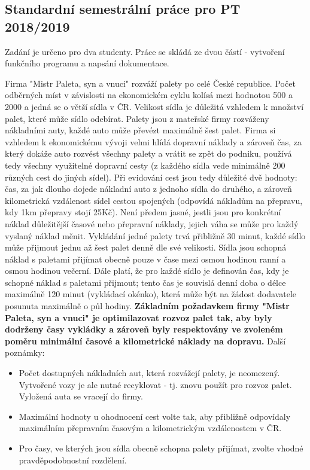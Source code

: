 \documentclass[ 12pt, a4paper]{article}
\begin{document}
\subsection{Standardní semestrální práce pro PT 2018/2019}
Zadání je určeno pro dva studenty. Práce se skládá ze dvou částí - vytvoření funkčního programu a napsání dokumentace.
\newline
\par Firma "Mistr Paleta, syn a vnuci" rozváží palety po celé České republice. Počet odběrných míst v závislosti na ekonomickém cyklu kolísá mezi hodnotou 500 a 2000 a jedná se o větší sídla v ČR. Velikost sídla je důležitá vzhledem k množství palet, které může sídlo odebírat. Palety jsou z mateřské firmy rozváženy nákladními auty, každé auto může převézt maximálně šest palet. Firma si vzhledem k ekonomickému vývoji velmi hlídá dopravní náklady a zároveň čas, za který dokáže auto rozvést všechny palety a vrátit se zpět do podniku, používá tedy všechny využitelné dopravní cesty (z každého sídla vede minimálně 200 různých cest do jiných sídel). Při evidování cest jsou tedy důležité dvě hodnoty: čas, za jak dlouho dojede nákladní auto z jednoho sídla do druhého, a zároveň kilometrická vzdálenost sídel cestou spojených (odpovídá nákladům na přepravu, kdy 1km přepravy stojí 25Kč). Není předem jasné, jestli jsou pro konkrétní náklad důležitější časové nebo přepravní náklady, jejich váha se může pro každý vyslaný náklad měnit. Vykládání jedné palety trvá přibližně 30 minut, každé sídlo může přijmout jednu až šest palet denně dle své velikosti. Sídla jsou schopná náklad s paletami přijímat obecně pouze v čase mezi osmou hodinou ranní a osmou hodinou večerní. Dále platí, že pro každé sídlo je definován čas, kdy je schopné náklad s paletami přijmout; tento čas je souvislá denní doba o délce maximálně 120 minut (vykládací okénko), která může být na žádost dodavatele posunuta maximálně o půl hodiny. \textbf{Základním požadavkem firmy "Mistr Paleta, syn a vnuci" je optimilazovat rozvoz palet tak, aby byly dodrženy časy vykládky a zároveň byly respektovány ve zvoleném poměru minimální časové a kilometrické náklady na dopravu.}\newpage
Další poznámky:\newline
\begin{itemize}
  \item Počet dostupných nákladních aut, která rozvážejí palety, je neomezený. Vytvořené vozy je ale nutné recyklovat - tj. znovu použít pro rozvoz palet. Vyložená auta se vracejí do firmy.
  \item Maximální hodnoty u ohodnocení cest volte tak, aby přibližně odpovídaly maximálním přepravním časovým a kilometrickým vzdálenostem v ČR.
  \item Pro časy, ve kterých jsou sídla obecně schopna palety přijímat, zvolte vhodné pravděpodobnostní rozdělení.
\end{itemize}
\end{document}
